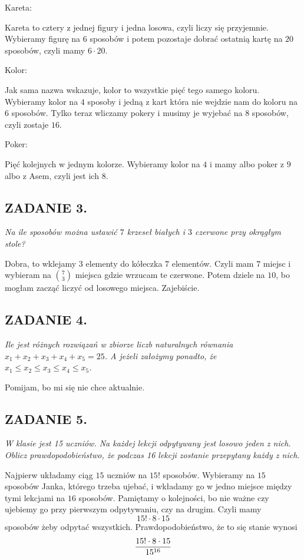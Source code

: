 \documentclass{article}
\begin{document}
{\color{green}Kareta:}

Kareta to cztery z jednej figury i jedna losowa, czyli liczy się przyjemnie. Wybieramy figurę na $6$ sposobów i potem pozostaje dobrać ostatnią kartę na $20$ sposobów, czyli mamy $6\cdot 20$.

\smallskip

{\color{green}Kolor:}

Jak sama nazwa wskazuje, kolor to wszystkie pięć tego samego koloru. Wybieramy kolor na $4$ sposoby i jedną z kart która nie wejdzie nam do koloru na $6$ sposobów. Tylko teraz wliczamy pokery i musimy je wyjebać na $8$ sposobów, czyli zostaje $16$.
\smallskip

{\color{green}Poker:}

Pięć kolejnych w jednym kolorze. Wybieramy kolor na $4$ i mamy albo poker z $9$ albo z Asem, czyli jest ich $8$.

\subsection*{ZADANIE 3.}
\emph{Na ile sposobów można ustawić $7$ krzeseł białych i $3$ czerwone przy okrągłym stole?}
\smallskip

Dobra, to wklejamy $3$ elementy do kółeczka $7$ elementów. Czyli mam $7$ miejsc i wybieram na ${7\choose 3}$ miejsca gdzie wrzucam te czerwone. Potem dziele na $10$, bo mogłam zacząć liczyć od losowego miejsca. Zajebiście.

\subsection*{ZADANIE 4.}
\emph{Ile jest różnych rozwiązań w zbiorze liczb naturalnych równania $x_1+x_2+x_3+x_4+x_5=25$. A jeżeli założymy ponadto, że $x_1\leq x_2\leq x_3\leq x_4\leq x_5$.}
\smallskip

Pomijam, bo mi się nie chce aktualnie.

\subsection*{ZADANIE 5.}
\emph{W klasie jest 15 uczniów. Na każdej lekcji odpytywany jest losowo jeden z nich. Oblicz prawdopodobieństwo, że podczas 16 lekcji zostanie przepytany każdy z nich.}
\smallskip

Najpierw układamy ciąg $15$ uczniów na $15!$ sposobów. Wybieramy na $15$ sposobów Janka, którego trzeba ujebać, i wkładamy go w jedno miejsce między tymi lekcjami na $16$ sposobów. Pamiętamy o kolejności, bo nie ważne czy ujebiemy go przy pierwszym odpytywaniu, czy na drugim. Czyli mamy
$$15!\cdot8\cdot 15$$
sposobów żeby odpytać wszystkich. Prawdopodobieństwo, że to się stanie wynosi
$${15!\cdot8\cdot15\over15^{16}}$$ 
\end{document}
